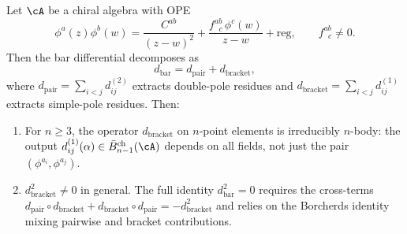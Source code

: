 \begin{proposition}
\label{prop:nonabelian-kernel-nonfactorization}
Let\/ $\cA$ be a chiral algebra with OPE
\[
\phi^a(z)\phi^b(w)
= \frac{C^{ab}}{(z-w)^2}
  + \frac{f^{ab}_{\;\;c}\, \phi^c(w)}{z-w}
  + \mathrm{reg},
\qquad f^{ab}_{\;\;c} \neq 0.
\]
Then the bar differential decomposes as
\begin{equation}\label{eq:bar-diff-pair-bracket}
d_{\mathrm{bar}} = d_{\mathrm{pair}} + d_{\mathrm{bracket}},
\end{equation}
where $d_{\mathrm{pair}} = \sum_{i<j} d_{ij}^{(2)}$ extracts
double-pole residues and
$d_{\mathrm{bracket}} = \sum_{i<j} d_{ij}^{(1)}$ extracts
simple-pole residues.  Then:
\begin{enumerate}[label=\textup{(\roman*)}]
\item For $n \geq 3$, the operator $d_{\mathrm{bracket}}$ on
  $n$-point elements is irreducibly $n$-body: the output
  $d_{ij}^{(1)}(\alpha) \in \bar{B}^{\mathrm{ch}}_{n-1}(\cA)$
  depends on all fields, not just the pair
  $(\phi^{a_i}, \phi^{a_j})$.
\item $d_{\mathrm{bracket}}^2 \neq 0$ in general.  The full
  identity $d_{\mathrm{bar}}^2 = 0$ requires the cross-terms
  $d_{\mathrm{pair}} \circ d_{\mathrm{bracket}}
  + d_{\mathrm{bracket}} \circ d_{\mathrm{pair}}
  = -d_{\mathrm{bracket}}^2$
  and relies on the Borcherds identity mixing pairwise and
  bracket contributions.
\end{enumerate}
\end{proposition}

